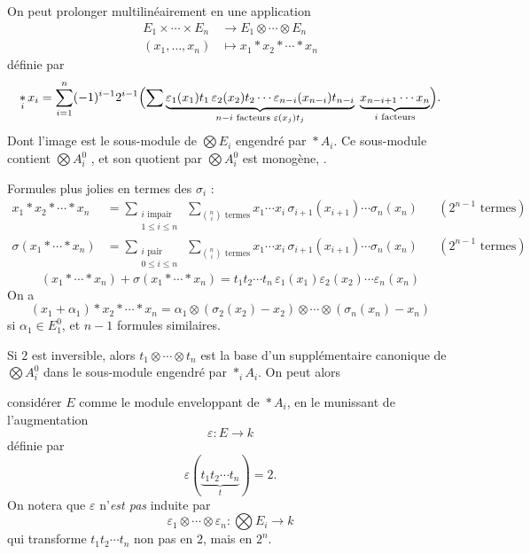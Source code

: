 \documentclass[11pt,a4paper]{article}
\begin{document}
On peut prolonger multilinéairement en une application
\[
  \begin{aligned}
    E_1 \times \cdots \times E_n &\longrightarrow E_1 \otimes \cdots \otimes E_n \\
    (x_1, \ldots, x_n) &\longmapsto x_1 * x_2 * \cdots * x_n
  \end{aligned}
\]
définie par
\[
  \mathop{\ast}_i x_i = \sum_{i=1}^{n} (-1)^{i-1} 2^{i-1}
  \Bigl(\sum \underbrace{\varepsilon_1(x_1) t_1\, \varepsilon_2(x_2) t_2 \cdots \varepsilon_{n-i}(x_{n-i}) t_{n-i}}_{n-i \text{ facteurs } \varepsilon(x_j) t_j}\;
  \underbrace{x_{n-i+1} \cdots x_n}_{i \text{ facteurs}}\Bigr).
\]
Dont l'image est le sous-module de $\bigotimes E_i$ engendré par $\mathop{\ast} A_i$. Ce sous-module  contient  $\bigotimes A_i^0$ , et son quotient par $\bigotimes A_i^0$ est monogène, . 

Formules plus jolies en termes des $\sigma_i$ :
\[
  \begin{aligned}
    x_1 * x_2 * \cdots * x_n &= \sum_{\substack{i \text{ impair} \\ 1 \leq i \leq n}} \ \sum_{\binom{n}{i} \text{ termes}} x_1 \cdots x_i\, \sigma_{i+1}(x_{i+1}) \cdots \sigma_n(x_n) && (2^{n-1} \text{ termes}) \\
    \sigma(x_1 * \cdots * x_n) &= \sum_{\substack{i \text{ pair} \\ 0 \leq i \leq n}} \ \sum_{\binom{n}{i} \text{ termes}} x_1 \cdots x_i\, \sigma_{i+1}(x_{i+1}) \cdots \sigma_n(x_n) && (2^{n-1} \text{ termes})
  \end{aligned}
\]
\[
  (x_1 * \cdots * x_n) + \sigma(x_1 * \cdots * x_n) = t_1 t_2 \cdots t_n\, \varepsilon_1(x_1) \varepsilon_2(x_2) \cdots \varepsilon_n(x_n)
\]
On a \struck{\ill{}}
\[
  (x_1 + \alpha_1) * x_2 * \cdots * x_n = \alpha_1 \otimes (\sigma_2(x_2) - x_2) \otimes \cdots \otimes (\sigma_n(x_n) - x_n)
\]
si $\alpha_1 \in E_1^0$, et $n - 1$ formules similaires.

Si $2$ est inversible, alors $t_1 \otimes \cdots \otimes t_n$ est la base d'un supplémentaire canonique  de $\bigotimes A_i^0$ dans le sous-module  engendré par $\mathop{\ast}_i A_i$. On peut alors

considérer $E$ comme le module enveloppant de $\mathop{\ast} A_i$, en le munissant de l'augmentation
\[
  \varepsilon : E \longrightarrow k
\]
définie par
\[
  \varepsilon(\underbrace{t_1 t_2 \cdots t_n}_{t}) = 2 .
\]
On notera que $\varepsilon$ n'\emph{est pas} induite par
\[
  \varepsilon_1 \otimes \cdots \otimes \varepsilon_n : \bigotimes E_i \longrightarrow k
\]
qui transforme $t_1 t_2 \cdots t_n$ non pas en $2$, mais en $2^n$.
\end{document}
